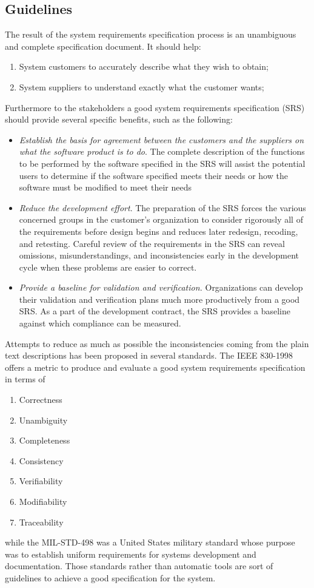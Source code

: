 \subsection{Guidelines}


The result of the system requirements specification process is an
unambiguous and complete specification document. It should help:
\begin{enumerate}[label=\alph*)]
\item System customers to accurately describe what they wish to obtain;
\item System suppliers to understand exactly what the customer wants;
\end{enumerate}
Furthermore to the stakeholders a good system requirements specification (SRS) should provide several specific benefits, such as the following:
\begin{itemize}[label={--}]
\item \textit{Establish the basis for agreement between the customers and the suppliers on what the software
product is to do}. The complete description of the functions to be performed by the software specified
in the SRS will assist the potential users to determine if the software specified meets their needs or
how the software must be modified to meet their needs
\item \textit{Reduce the development effort}. The preparation of the SRS forces the various concerned groups in
the customer’s organization to consider rigorously all of the requirements before design begins and
reduces later redesign, recoding, and retesting. Careful review of the requirements in the SRS can
reveal omissions, misunderstandings, and inconsistencies early in the development cycle when these
problems are easier to correct.
\item \textit{Provide a baseline for validation and verification.} Organizations can develop their validation and
verification plans much more productively from a good SRS. As a part of the development contract,
the SRS provides a baseline against which compliance can be measured.
\end{itemize}
\par Attempts to reduce as much as possible the inconsistencies coming from the plain text descriptions has been proposed in several standards. The IEEE 830-1998 \citep{ieee1998ieee} offers a metric to produce and evaluate a good system requirements specification in terms of 
\begin{enumerate}[label=\alph*)]
\item Correctness
\item Unambiguity
\item Completeness
\item Consistency
\item Verifiability
\item Modifiability
\item Traceability
\end{enumerate}
while the MIL-STD-498 \citep{united1994mil} was a United States military standard whose purpose was to establish uniform requirements for systems development and documentation. Those standards rather than automatic tools are sort of guidelines to achieve a good specification for the system.

